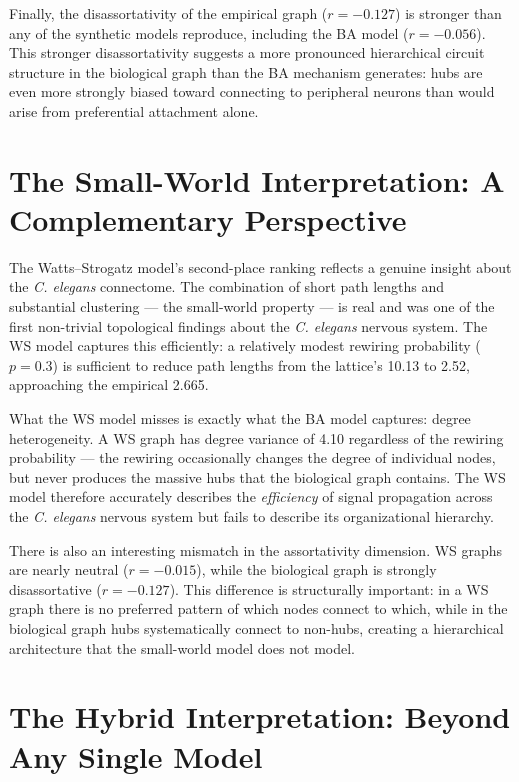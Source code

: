 \documentclass[12pt,a4paper]{report}
\begin{document}
Finally, the disassortativity of the empirical graph ($r = -0.127$) is stronger than any of the synthetic models reproduce, including the BA model ($r = -0.056$). This stronger disassortativity suggests a more pronounced hierarchical circuit structure in the biological graph than the BA mechanism generates: hubs are even more strongly biased toward connecting to peripheral neurons than would arise from preferential attachment alone.

\section{The Small-World Interpretation: A Complementary Perspective}

The Watts--Strogatz model's second-place ranking reflects a genuine insight about the \textit{C. elegans} connectome. The combination of short path lengths and substantial clustering — the small-world property — is real and was one of the first non-trivial topological findings about the \textit{C. elegans} nervous system. The WS model captures this efficiently: a relatively modest rewiring probability ($p = 0.3$) is sufficient to reduce path lengths from the lattice's 10.13 to 2.52, approaching the empirical 2.665.

What the WS model misses is exactly what the BA model captures: degree heterogeneity. A WS graph has degree variance of 4.10 regardless of the rewiring probability — the rewiring occasionally changes the degree of individual nodes, but never produces the massive hubs that the biological graph contains. The WS model therefore accurately describes the \textit{efficiency} of signal propagation across the \textit{C. elegans} nervous system but fails to describe its organizational hierarchy.

There is also an interesting mismatch in the assortativity dimension. WS graphs are nearly neutral ($r = -0.015$), while the biological graph is strongly disassortative ($r = -0.127$). This difference is structurally important: in a WS graph there is no preferred pattern of which nodes connect to which, while in the biological graph hubs systematically connect to non-hubs, creating a hierarchical architecture that the small-world model does not model.

\section{The Hybrid Interpretation: Beyond Any Single Model}
\end{document}
